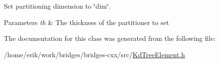 Set partitioning dimension to \char`\"{}dim\char`\"{}. 


\begin{DoxyParams}{Parameters}
{\em th} & The thickness of the partitioner to set \\
\hline
\end{DoxyParams}


The documentation for this class was generated from the following file\+:\begin{DoxyCompactItemize}
\item 
/home/erik/work/bridges/bridges-\/cxx/src/\hyperlink{_kd_tree_element_8h}{Kd\+Tree\+Element.\+h}\end{DoxyCompactItemize}
